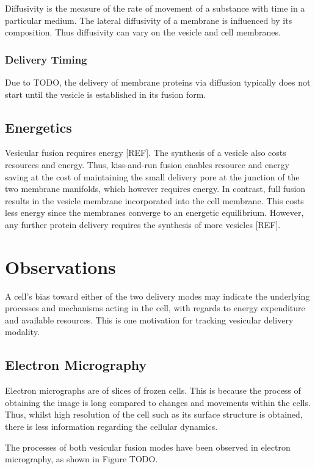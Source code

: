 \documentclass{report}
\begin{document}
Diffusivity is the measure of the rate of movement of a substance with time in a particular medium. The lateral diffusivity of a membrane is influenced by its composition. Thus diffusivity can vary on the vesicle and cell membranes.

\subsection{Delivery Timing}
Due to TODO, the delivery of membrane proteins via diffusion typically does not start until the vesicle is established in its fusion form.

\section{Energetics}
Vesicular fusion requires energy [REF]. The synthesis of a vesicle also costs resources and energy. Thus, kiss-and-run fusion enables resource and energy saving at the cost of maintaining the small delivery pore at the junction of the two membrane manifolds, which however requires energy. In contrast, full fusion results in the vesicle membrane incorporated into the cell membrane. This costs less energy since the membranes converge to an energetic equilibrium. However, any further protein delivery requires the synthesis of more vesicles [REF].

\chapter{Observations}
A cell's bias toward either of the two delivery modes may indicate the underlying processes and mechanisms acting in the cell, with regards to energy expenditure and available resources. This is one motivation for tracking vesicular delivery modality.

\section{Electron Micrography}
Electron micrographs are of slices of frozen cells. This is because the process of obtaining the image is long compared to changes and movements within the cells. Thus, whilst high resolution of the cell such as its surface structure is obtained, there is less information regarding the cellular dynamics.

The processes of both vesicular fusion modes have been observed in electron micrography, as shown in Figure TODO.
\end{document}
